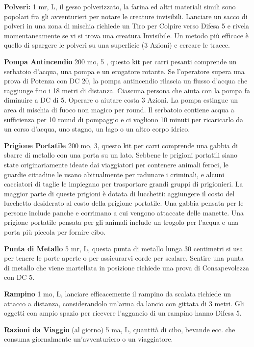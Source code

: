 \documentclass[a4paper,11pt,twoside,openany]{book}
\begin{document}
\textbf{Polveri:} 1 mr, L, il gesso polverizzato, la farina ed altri materiali simili sono popolari fra gli avventurieri per notare le creature invisibili. Lanciare un sacco di polveri in una zona di mischia richiede un Tiro per Colpire verso Difesa 5 e rivela momentaneamente se vi si trova una creatura Invisibile. Un metodo più efficace è quello di spargere le polveri su una superficie (3 Azioni) e cercare le tracce.

\textbf{Pompa Antincendio} 200 mo, 5 , questo kit per carri pesanti comprende un serbatoio d'acqua, una pompa e un erogatore rotante. Se l'operatore supera una prova di Potenza con DC 20, la pompa antincendio rilascia un flusso d'acqua che raggiunge fino i 18 metri di distanza. Ciascuna persona che aiuta con la pompa fa diminuire a DC di 5. Operare o aiutare costa 3 Azioni. La pompa estingue un area di mischia di fuoco non magico per round. Il serbatoio contiene acqua a sufficienza per 10 round di pompaggio e ci vogliono 10 minuti per ricaricarlo da un corso d'acqua, uno stagno, un lago o un altro corpo idrico.

\textbf{Prigione Portatile} 200 mo, 3, questo kit per carri comprende una gabbia di sbarre di metallo con una porta su un lato. Sebbene le prigioni portatili siano state originariamente ideate dai viaggiatori per contenere animali feroci, le guardie cittadine le usano abitualmente per radunare i criminali, e alcuni cacciatori di taglie le impiegano per trasportare grandi gruppi di prigionieri. La maggior parte di queste prigioni è dotata di lucchetti: aggiungere il costo del lucchetto desiderato al costo della prigione portatile. Una gabbia pensata per le persone include panche e corrimano a cui vengono attaccate delle manette. Una prigione portatile pensata per gli animali include un trogolo per l'acqua e una porta più piccola per fornire cibo.

\textbf{Punta di Metallo} 5 mr, L, questa punta di metallo lunga 30 centimetri si usa per tenere le porte aperte o per assicurarvi corde per scalare. Sentire una punta di metallo che viene martellata in posizione richiede una prova di Consapevolezza con DC 5.

\textbf{Rampino} 1 mo, L, lanciare efficacemente il rampino da scalata richiede un attacco a distanza, considerandolo un'arma da lancio con gittata di 3 metri. Gli oggetti con ampio spazio per ricevere l'aggancio di un rampino hanno Difesa 5.

\textbf{Razioni da Viaggio} (al giorno) 5 ma, L, quantità di cibo, bevande ecc. che consuma giornalmente un'avventuriero o un viaggiatore.
\end{document}
